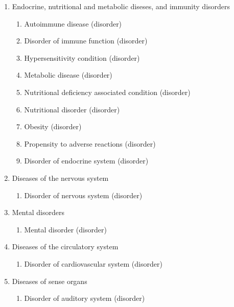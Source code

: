 \documentclass{article}[11pt,oneside]
\begin{document}
\begin{multicols}{2}
\begin{enumerate}
\begin{enumerate}
 \end{enumerate} 
\item Endocrine, nutritional and metabolic diseses, and immunity disorders 
 \begin{enumerate} 
 \item Autoimmune disease (disorder) %
 \item Disorder of immune function (disorder) %
 \item Hypersensitivity condition (disorder) %
 \item Metabolic disease (disorder) %
 \item Nutritional deficiency associated condition (disorder) %
 \item Nutritional disorder (disorder) %
 \item Obesity (disorder) %
 \item Propensity to adverse reactions (disorder) %
 \item Disorder of endocrine system (disorder) %
 \end{enumerate} 
\item Diseases of the nervous system 
 \begin{enumerate} 
 \item Disorder of nervous system (disorder) %
 \end{enumerate} 
\item Mental disorders 
 \begin{enumerate} 
 \item Mental disorder (disorder) %
 \end{enumerate} 
\item Diseases of the circulatory system 
 \begin{enumerate} 
 \item Disorder of cardiovascular system (disorder) %
 \end{enumerate} 
\item Diseases of sense organs 
 \begin{enumerate} 
 \item Disorder of auditory system (disorder) %

\end{enumerate}
\end{enumerate}
\end{multicols}
\end{document}

